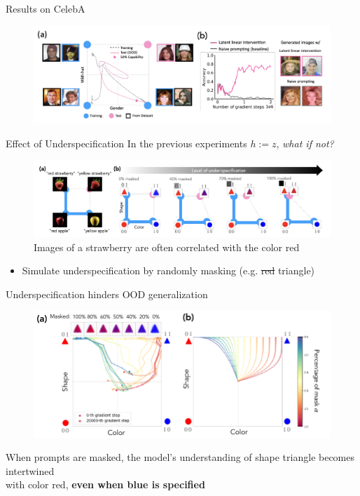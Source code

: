 \begin{frame}[t]{Results on CelebA}

\begin{figure}
    \centering
    \includegraphics[width=0.95\linewidth]{figures/celeba.png}
\end{figure}
\end{frame}

\begin{frame}[t]{Effect of Underspecification}
\qquad In the previous experiments $h := z$, \textit{what if not?}
\begin{figure}
    \centering
    \includegraphics[width=0.8\linewidth]{figures/figure_9.png}
    \caption{Images of a strawberry are
often correlated with the color red}
\end{figure}
\begin{itemize}
    \item Simulate underspecification by randomly masking (e.g. \sout{red} triangle)
\end{itemize}
\end{frame}

\begin{frame}[t]{Underspecification hinders OOD generalization}
\begin{figure}
    \centering
    \includegraphics[width=0.65\linewidth]{figures/figure_10.png}
\end{figure}
\qquad When prompts are masked, the model’s understanding of shape triangle becomes intertwined
\\ \qquad
with color red, \textbf{even when blue is specified}
\end{frame}

